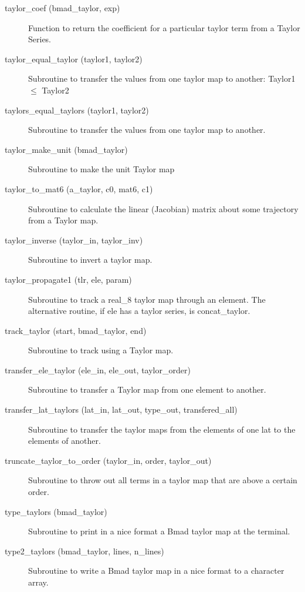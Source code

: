 \begin{description}
\item[taylor_coef (bmad_taylor, exp)] \Newline 
Function to return the coefficient for a particular taylor term from a
Taylor Series.

\item[taylor_equal_taylor (taylor1, taylor2)] \Newline
Subroutine to transfer the values from one taylor map to another:
Taylor1 $\le$ Taylor2

\item[taylors_equal_taylors (taylor1, taylor2)] \Newline 
Subroutine to transfer the values from one taylor map to another.

\item[taylor_make_unit (bmad_taylor)] \Newline
Subroutine to make the unit Taylor map

\item[taylor_to_mat6 (a_taylor, c0, mat6, c1)] \Newline
Subroutine to calculate the linear (Jacobian) matrix about some
trajectory from a Taylor map.

\item[taylor_inverse (taylor_in, taylor_inv)] \Newline
Subroutine to invert a taylor map. 

\item[taylor_propagate1 (tlr, ele, param)] \Newline
Subroutine to track a real_8 taylor map through an element. 
The alternative routine, if ele has a taylor series, is concat_taylor. 

\item[track_taylor (start, bmad_taylor, end)] \Newline
Subroutine to track using a Taylor map. 

\item[transfer_ele_taylor (ele_in, ele_out, taylor_order)] \Newline 
Subroutine to transfer a Taylor map from one element to another.

\item[transfer_lat_taylors (lat_in, lat_out, 
                                             type_out, transfered_all) ] \Newline 
Subroutine to transfer the taylor maps from the elements of one lat to
the elements of another. 

\item[truncate_taylor_to_order (taylor_in, order, taylor_out)] \Newline 
Subroutine to throw out all terms in a taylor map that are above a certain order.

\item[type_taylors (bmad_taylor)] \Newline
Subroutine to print in a nice format a Bmad taylor map at the terminal. 

\item[type2_taylors (bmad_taylor, lines, n_lines)] \Newline
Subroutine to write a Bmad taylor map in a nice format to a character array. 

\end{description}

